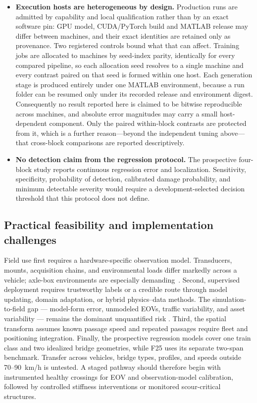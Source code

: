 \begin{itemize}
  \item \textbf{Execution hosts are heterogeneous by design.} Production runs
  are admitted by capability and local qualification rather than by an exact
  software pin: GPU model, CUDA/PyTorch build and MATLAB release may differ
  between machines, and their exact identities are retained only as
  provenance. Two registered controls bound what that can affect. Training
  jobs are allocated to machines by seed-index parity, identically for every
  compared pipeline, so each allocation seed resolves to a single machine and
  every contrast paired on that seed is formed within one host. Each
  generation stage is produced entirely under one MATLAB environment, because
  a run folder can be resumed only under its recorded release and environment
  digest. Consequently no result reported here is claimed to be bitwise
  reproducible across machines, and absolute error magnitudes may carry a
  small host-dependent component. Only the paired within-block contrasts are
  protected from it, which is a further reason---beyond the independent tuning
  above---that cross-block comparisons are reported descriptively.

  \item \textbf{No detection claim from the regression protocol.} The
  prospective four-block study reports continuous regression
  error and localization. Sensitivity, specificity, probability of detection,
  calibrated damage probability, and minimum detectable severity would require
  a development-selected decision threshold that this protocol does not define.
\end{itemize}

\subsection{Practical feasibility and implementation challenges}

Field use first requires a hardware-specific observation model. Transducers,
mounts, acquisition chains, and environmental loads differ markedly across a
vehicle; axle-box environments are especially demanding~\cite{en61373}.
Second, supervised deployment requires trustworthy labels or a credible route
through model updating, domain adaptation, or hybrid physics--data methods.
The simulation-to-field gap --- model-form error, unmodeled EOVs, traffic
variability, and asset variability --- remains the dominant unquantified risk
\cite{malekjafarian2015review, fernandes2026canelas}. Third, the spatial
transform assumes known passage speed and repeated passages require fleet and
positioning integration. Finally, the prospective regression models cover one
train class and two idealized bridge geometries, while F25 uses its separate
two-span benchmark. Transfer across vehicles, bridge types, profiles,
and speeds outside 70--90~km/h is untested. A staged pathway should therefore
begin with instrumented healthy crossings for EOV and observation-model
calibration, followed by controlled stiffness interventions or monitored
scour-critical structures.

